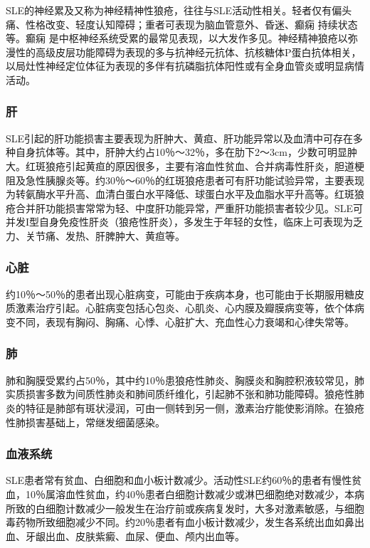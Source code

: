 SLE的神经累及又称为神经精神性狼疮，往往与SLE活动性相关。轻者仅有偏头痛、性格改变、轻度认知障碍；重者可表现为脑血管意外、昏迷、癫痫
持续状态等。癫痫
是中枢神经系统受累的最常见表现，以大发作多见。神经精神狼疮以弥漫性的高级皮层功能障碍为表现的多与抗神经元抗体、抗核糖体P蛋白抗体相关，以局灶性神经定位体征为表现的多伴有抗磷脂抗体阳性或有全身血管炎或明显病情活动。

\subsubsection{肝}

SLE引起的肝功能损害主要表现为肝肿大、黄疸、肝功能异常以及血清中可存在多种自身抗体等。其中，肝肿大约占10％～32％，多在肋下2～3cm，少数可明显肿大。红斑狼疮引起黄疸的原因很多，主要有溶血性贫血、合并病毒性肝炎，胆道梗阻及急性胰腺炎等。约30％～60％的红斑狼疮患者可有肝功能试验异常，主要表现为转氨酶水平升高、血清白蛋白水平降低、球蛋白水平及血脂水平升高等。红斑狼疮合并肝功能损害常常为轻、中度肝功能异常，严重肝功能损害者较少见。SLE可并发I型自身免疫性肝炎（狼疮性肝炎），多发生于年轻的女性，临床上可表现为乏力、关节痛、发热、肝脾肿大、黄疸等。

\subsubsection{心脏}

约10％～50％的患者出现心脏病变，可能由于疾病本身，也可能由于长期服用糖皮质激素治疗引起。心脏病变包括心包炎、心肌炎、心内膜及瓣膜病变等，依个体病变不同，表现有胸闷、胸痛、心悸、心脏扩大、充血性心力衰竭和心律失常等。

\subsubsection{肺}

肺和胸膜受累约占50％，其中约10％患狼疮性肺炎、胸膜炎和胸腔积液较常见，肺实质损害多数为间质性肺炎和肺间质纤维化，引起肺不张和肺功能障碍。狼疮性肺炎的特征是肺部有斑状浸润，可由一侧转到另一侧，激素治疗能使影消除。在狼疮性肺损害基础上，常继发细菌感染。

\subsubsection{血液系统}

SLE患者常有贫血、白细胞和血小板计数减少。活动性SLE约60％的患者有慢性贫血，10％属溶血性贫血，约40％患者白细胞计数减少或淋巴细胞绝对数减少，本病所致的白细胞计数减少一般发生在治疗前或疾病复发时，大多对激素敏感，与细胞毒药物所致细胞减少不同。约20％患者有血小板计数减少，发生各系统出血如鼻出血、牙龈出血、皮肤紫癜、血尿、便血、颅内出血等。

